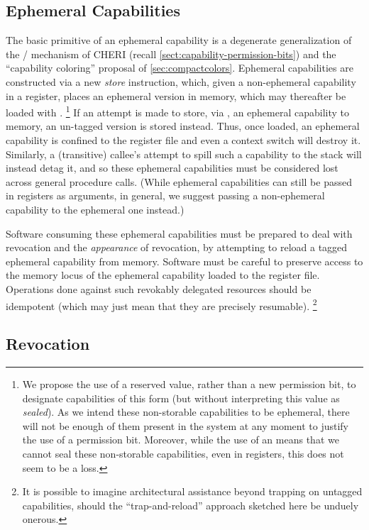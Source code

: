 \subsection{Ephemeral Capabilities} %

The basic primitive of an ephemeral capability is a degenerate
generalization of the \cappermG* / \cappermSLC* mechanism of CHERI (recall
\cref{sect:capability-permission-bits}) and the ``capability coloring''
proposal of \cref{sec:compactcolors}.  Ephemeral capabilities are
constructed via a new \emph{store} instruction,
 which, given a non-ephemeral capability
in a register, places an ephemeral version in memory, which may thereafter
be loaded with .%
%
\footnote{We propose the use of a reserved \cotype{} value, rather than a new
permission bit, to designate capabilities of this form (but without
interpreting this value as \emph{sealed}).  As we intend these non-storable
capabilities to be ephemeral, there will not be enough of them present in
the system at any moment to justify the use of a permission bit.  Moreover,
while the use of an \cotype{} means that we cannot seal these non-storable
capabilities, even in registers, this does not seem to be a loss.}
%
If an attempt is made to store, via , an ephemeral
capability to memory, an un-tagged version is stored instead.  Thus, once
loaded, an ephemeral capability is confined to the register file and even a
context switch will destroy it.  Similarly, a (transitive) callee's attempt
to spill such a capability to the stack will instead detag it, and so these
ephemeral capabilities must be considered lost across general procedure
calls.  (While ephemeral capabilities can still be passed in registers as
arguments, in general, we suggest passing a non-ephemeral capability to the
ephemeral one instead.)

Software consuming these ephemeral capabilities must be prepared to deal
with revocation and the \emph{appearance} of revocation, by attempting to
reload a tagged ephemeral capability from memory.  Software must be careful
to preserve access to the memory locus of the ephemeral capability loaded to
the register file.  Operations done against such revokably delegated
resources should be idempotent (which may just mean that they are precisely
resumable).%
%
\footnote{It is possible to imagine architectural assistance beyond trapping
on untagged capabilities, should the ``trap-and-reload'' approach sketched
here be unduely onerous.}

\subsection{Revocation} %


